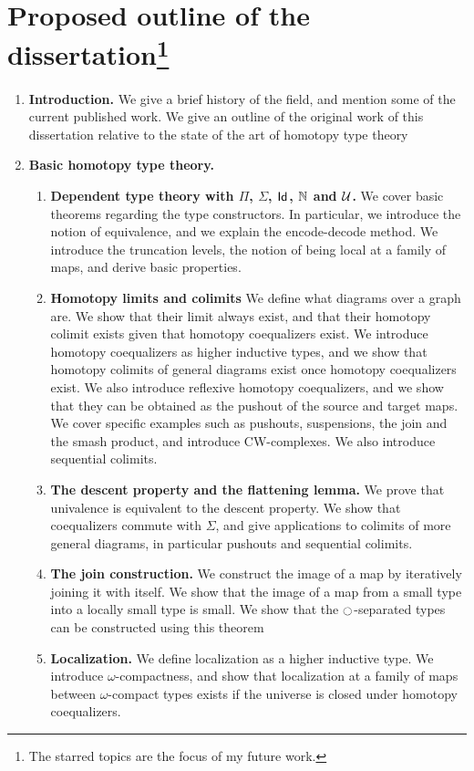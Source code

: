 \documentclass[reqno]{amsart}
\begin{document}
\section{Proposed outline of the dissertation\footnote{The starred topics are the focus of my future work.}}\label{outline}
\begin{enumerate}[label=\arabic*.]
\item \textbf{Introduction.} We give a brief history of the field, and mention
some of the current published work. We give an outline of the original work of
this dissertation relative to the state of the art of homotopy type theory
\item \textbf{Basic homotopy type theory.}
\begin{enumerate}[label*=\arabic*.]
\item \textbf{Dependent type theory with $\Pi$, $\Sigma$, $\mathsf{Id}_{}$, $\mathbb{N}$ and $\mathcal{U}$.} We cover basic theorems regarding the type constructors. In particular, we introduce the notion of equivalence, and we explain the encode-decode method. We introduce the truncation levels, the notion of being local at a family of maps, and derive basic properties.
\item \textbf{Homotopy limits and colimits} We define what diagrams over a graph are. We show that their limit always exist, and that their homotopy colimit exists given that homotopy coequalizers exist. We introduce homotopy coequalizers as higher inductive types, and we show that homotopy colimits of general diagrams exist once homotopy coequalizers exist. We also introduce reflexive homotopy coequalizers, and we show that they can be obtained as the pushout of the source and target maps.
We cover specific examples such as pushouts, suspensions, the join and the smash product, and introduce CW-complexes. We also introduce sequential colimits.
\item \textbf{The descent property and the flattening lemma.} We prove that univalence is equivalent to the descent property. We show that coequalizers commute with $\Sigma$, and give applications to colimits of more general diagrams, in particular pushouts and sequential colimits.
\item \textbf{The join construction.} We construct the image of a map by iteratively joining it with itself. We show that the image of a map from a small type into a locally small type is small. We show that the ${\ocircle}$-separated types can be constructed using this theorem
\item \textbf{Localization.} We define localization as a higher inductive type. We introduce $\omega$-compactness, and show that localization at a family of maps between $\omega$-compact types exists if the universe is closed under homotopy coequalizers.

\end{enumerate}
\end{enumerate}
\end{document}

